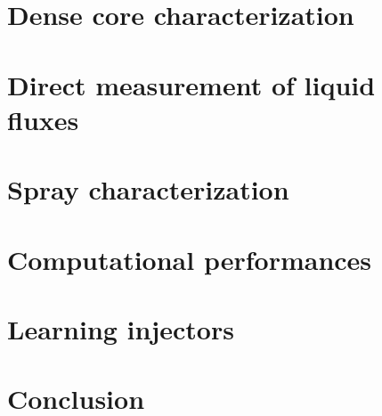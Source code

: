 %
%


\section{Dense core characterization}





\section{Direct measurement of liquid fluxes}



\section{Spray characterization}



\section{Computational performances}


\section{Learning injectors}




\section{Conclusion}
